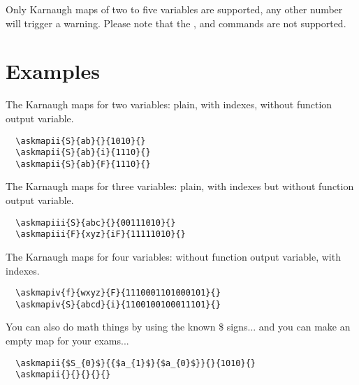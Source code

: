 \documentclass[a4paper,10pt]{ltxdoc}
\newcommand\Package[1]{\texttt{#1}}
\begin{document}
Only Karnaugh maps of two to five variables are supported, any other number
will trigger a warning. Please note that the , 
and  commands are not supported.
\medskip


\newpage
\section{Examples}
\label{sec:examples}
\askmapunitlength=0.88cm
The Karnaugh maps for two variables: plain, with indexes, without function
output variable.
\begin{verbatim}
  \askmapii{S}{ab}{}{1010}{}
  \askmapii{S}{ab}{i}{1110}{}
  \askmapii{S}{ab}{F}{1110}{}
\end{verbatim}
\bigskip\bigskip

The Karnaugh maps for three variables: plain, with indexes but without function
output variable.
\begin{verbatim}
  \askmapiii{S}{abc}{}{00111010}{}
  \askmapiii{F}{xyz}{iF}{11111010}{}
\end{verbatim}
\bigskip\bigskip

The Karnaugh maps for four variables: without function output variable, with
indexes.
\begin{verbatim}
  \askmapiv{f}{wxyz}{F}{1110001101000101}{}
  \askmapiv{S}{abcd}{i}{1100100100011101}{}
\end{verbatim}
\bigskip\bigskip

You can also do math things by using the known \$ signs... and you can make an
empty map for your exams...
\newpage
\begin{verbatim}
  \askmapii{$S_{0}$}{{$a_{1}$}{$a_{0}$}}{}{1010}{}
  \askmapii{}{}{}{}{}
\end{verbatim}
\askmapii{}{}{}{}{}
\bigskip\bigskip
\end{document}
